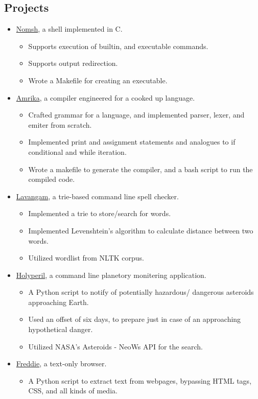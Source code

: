 \documentclass{article}
\begin{document}
\begin{multicols}{2}
\section*{Projects}
\begin{itemize}
\item \href{https://github.com/rcreddyn/nomsh}{Nomsh}, a shell implemented in C.
\begin{itemize}
\item Supports execution of builtin, and executable commands.
\item Supports output redirection.
\item Wrote a Makefile for creating an executable.
\end{itemize}
\item  \href{https://github.com/rcreddyn/nomsh}{Amrika}, a compiler engineered for a cooked up language.
\begin{itemize}
\item Crafted grammar for a language, and implemented parser, lexer, and emiter from scratch.
\item Implemented print and assignment statements and analogues to if conditional and while iteration.
\item Wrote a makefile to generate the compiler, and a bash script to run the compiled code.
\end{itemize}
\item \href{https://github.com/rcreddyn/nomsh}{Lavangam}, a trie-based command line spell checker.
\begin{itemize}
\item Implemented a trie to store/search for words.
\item Implemented Levenshtein's algorithm to calculate distance between two words.
\item Utilized wordlist from NLTK corpus.
\end{itemize}
\item \href{https://github.com/rcreddyn/nomsh}{Holyperil}, a command line planetory monitering application. 
\begin{itemize}
\item A Python script to notify of potentially hazardous/ dangerous asteroids approaching Earth.
\item Used an offset of six days, to prepare just in case of an approaching hypothetical danger.
\item Utilized NASA's Asteroids - NeoWs API for the search.
\end{itemize}
\item \href{https://github.com/rcreddyn/nomsh}{Freddie}, a text-only browser.
\begin{itemize}
\item A Python script to extract text from webpages, bypassing HTML tags, CSS, and all kinds of media.
\end{itemize}
\end{itemize} 
\end{multicols}
\end{document}
